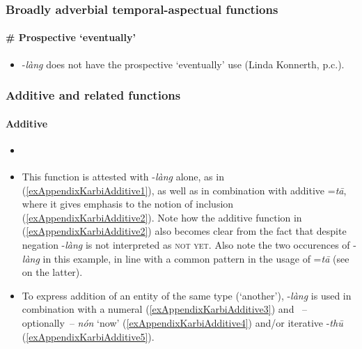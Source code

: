 \subsubsection{Broadly adverbial temporal-aspectual functions}
\paragraph{\# Prospective \lq eventually\rq}
\begin{itemize}
	\item \mbox{-\textit{làng}} does not have the prospective \lq eventually\rq{ }use (Linda Konnerth, p.c.).
\end{itemize}

\pagebreak
\subsubsection{Additive and related functions}
\paragraph{Additive}\label{appendixKarbiAdditive}
\begin{itemize}
	\item \textcite[335–336]{Konnerth2014}
	\item This function is attested with \mbox{-\textit{làng}} alone, as in (\ref{exAppendixKarbiAdditive1}), as well as in combination with additive \mbox{=\textit{tā}}, where it gives emphasis to the notion of inclusion (\ref{exAppendixKarbiAdditive2}). Note how the additive function in (\ref{exAppendixKarbiAdditive2}) also becomes clear from the fact that despite negation \mbox{-\textit{làng}} is not interpreted as \textsc{not yet}. Also note the two occurences of \mbox{-\textit{làng}} in this example, in line with a common pattern in the usage of \mbox{=\textit{tā}} (see \cite[344]{Konnerth2014} on the latter).
	\item To express addition of an entity of the same type (\lq another'), \mbox{-\textit{làng}} is used in combination with a numeral (\ref{exAppendixKarbiAdditive3}) and ~– optionally~– \textit{nón} \lq now' (\ref{exAppendixKarbiAdditive4}) and/or iterative \mbox{-\textit{thū}}  (\ref{exAppendixKarbiAdditive5}).
\end{itemize}

